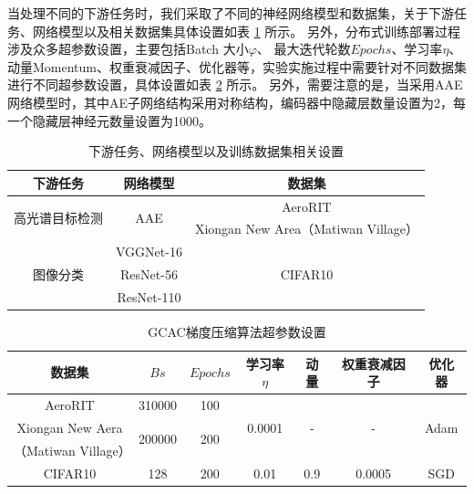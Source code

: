 \documentclass{xdupgthesis}
\begin{document}
当处理不同的下游任务时，我们采取了不同的神经网络模型和数据集，关于下游任务、网络模型以及相关数据集具体设置如表 \ref{tab_Network4task} 所示。
另外，分布式训练部署过程涉及众多超参数设置，主要包括Batch 大小$\varphi$、
最大迭代轮数$Epochs$、学习率$\eta$、动量Momentum、权重衰减因子、优化器等，实验实施过程中需要针对不同数据集进行不同超参数设置，具体设置如表 \ref{tab_Network-Parameter} 所示。
另外，需要注意的是，当采用AAE网络模型时，其中AE子网络结构采用对称结构，编码器中隐藏层数量设置为2，每一个隐藏层神经元数量设置为1000。

\renewcommand{\arraystretch}{1.3}
\begin{table}[ht]
    \centering
    \begin{threeparttable}
        \caption{下游任务、网络模型以及训练数据集相关设置}
        \label{tab_Network4task}
        \begin{tabular}{c|c|c}
            \toprule
            \toprule
            下游任务 & 网络模型 & 数据集 \\
            \midrule
            \multirow{2}{*}{高光谱目标检测} & \multirow{2}{*}{AAE} & AeroRIT \\
                    &         & Xiongan New Area（Matiwan Village） \\
            \midrule
            \multirow{3}{*}{图像分类} & VGGNet-16 & \multirow{3}{*}{CIFAR10} \\
                                    & ResNet-56 & \\
                                    & ResNet-110 & \\
            \bottomrule
            \bottomrule
        \end{tabular}
    \end{threeparttable}
\end{table}

\renewcommand{\arraystretch}{1.3}
\begin{table}[ht]
    \centering
    \begin{threeparttable}
        \caption{GCAC梯度压缩算法超参数设置}
        \label{tab_Network-Parameter}
        \begin{tabular}{c|c|c|c|c|c|c}
            \toprule
            \toprule
            数据集 & $Bs$& $Epochs$ & 学习率$\eta$ & 动量 & 权重衰减因子 & 优化器 \\
            \midrule
            AeroRIT & 310000 & 100 & \multirow{3}{*}{0.0001} & \multirow{3}{*}{-} & \multirow{3}{*}{-} & \multirow{3}{*}{Adam} \\
            Xiongan New Aera & \multirow{2}{*}{200000} &  \multirow{2}{*}{200} & & &  & \\
            （Matiwan Village） &  & & & & & \\
            \midrule
            CIFAR10 & 128 & 200 & 0.01 & 0.9 & 0.0005 & SGD \\
            \bottomrule
            \bottomrule
        \end{tabular}
    \end{threeparttable}
\end{table}
\end{document}
